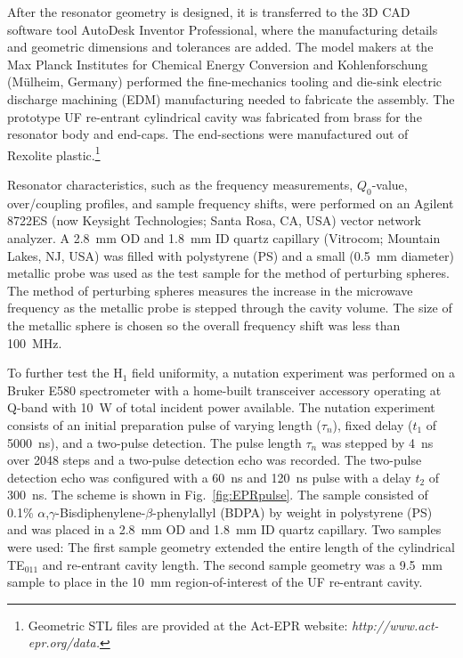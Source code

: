 After the resonator geometry is designed, it is transferred to the 3D CAD software tool AutoDesk Inventor Professional, where the manufacturing details and geometric dimensions and tolerances are added. The model makers at the Max Planck Institutes for Chemical Energy Conversion and Kohlenforschung (M\"ulheim, Germany) performed the fine-mechanics tooling and die-sink electric discharge machining (EDM) manufacturing needed to fabricate the assembly. The prototype UF re-entrant cylindrical \cylTE{} cavity was fabricated from brass for the resonator body and end-caps. The end-sections were manufactured out of Rexolite plastic.\footnote{Geometric STL files are provided at the Act-EPR website: \textit{http://www.act-epr.org/data.}}

Resonator characteristics, such as the frequency measurements, $Q_0$-value, over\-/coupling profiles, and sample frequency shifts, were performed on an Agilent 8722ES (now Keysight Technologies; Santa Rosa, CA, USA) vector network analyzer. A 2.8~mm OD and 1.8~mm ID quartz capillary (Vitrocom; Mountain Lakes, NJ, USA) was filled with polystyrene (PS) and a small (0.5~mm diameter) metallic probe was used as the test sample for the method of perturbing spheres. The method of perturbing spheres measures the increase in the microwave frequency as the metallic probe is stepped through the cavity volume. The size of the metallic sphere is chosen so the overall frequency shift was less than 100~MHz.

To further test the H$_1$ field uniformity, a nutation experiment was performed on a Bruker E580 spectrometer with a home-built transceiver accessory operating at Q-band with 10~W of total incident power available. The nutation experiment consists of an initial preparation pulse of varying length ($\tau_n$), fixed delay ($t_1$ of 5000~ns), and a two-pulse detection. The pulse length $\tau_n$ was stepped by 4~ns over 2048 steps and a two-pulse detection echo was recorded. \cite{pulsejeschke} The two-pulse detection echo was configured with a 60~ns and 120~ns pulse with a delay $t_2$ of 300~ns. The scheme is shown in Fig.~\ref{fig:EPRpulse}. The sample consisted of 0.1\% $\alpha$,$\gamma$-Bisdiphenylene-$\beta$-phenylallyl (BDPA) by weight in polystyrene (PS) and was placed in a 2.8~mm OD and 1.8~mm ID  quartz capillary. Two samples were used: The first sample geometry extended the entire length of the cylindrical TE$_{011}$ and re-entrant \cylTE{} cavity length. The second sample geometry was a 9.5~mm sample to place in the 10~mm region-of-interest of the UF re-entrant \cylTE{} cavity.

